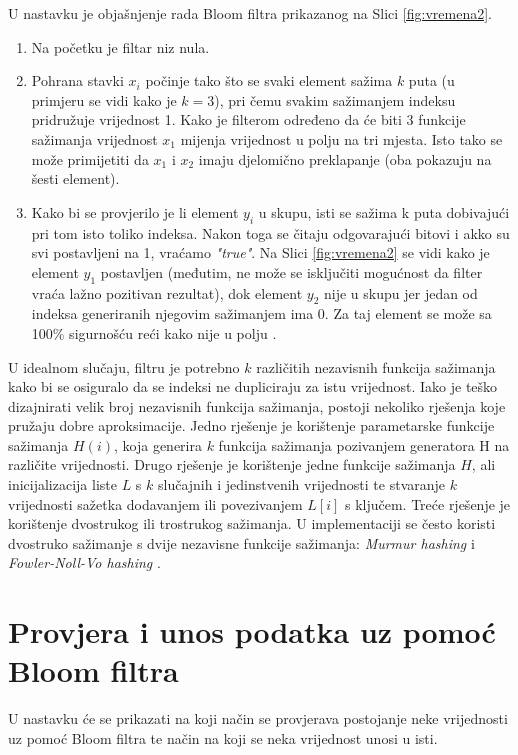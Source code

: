 \documentclass{foi}
\begin{document}
U nastavku je objašnjenje rada Bloom filtra prikazanog na Slici \ref{fig:vremena2}.
\begin{enumerate}[label=\Alph*)]
\item Na početku je filtar niz nula.
\item Pohrana stavki $x_i$ počinje tako što se svaki element sažima $k$ puta (u primjeru se vidi kako je $k=3$), pri čemu svakim sažimanjem indeksu pridružuje vrijednost 1. Kako je filterom određeno da će biti 3 funkcije sažimanja vrijednost $x_1$ mijenja vrijednost u polju na tri mjesta. Isto tako se može primijetiti da $x_1$ i $x_2$ imaju djelomično preklapanje (oba pokazuju na šesti element).
\item Kako bi se provjerilo je li element $y_i$ u skupu, isti se sažima k puta dobivajući pri tom isto toliko indeksa. Nakon toga se čitaju odgovarajući bitovi i akko su svi postavljeni na 1, vraćamo \textit{"true"}. Na Slici \ref{fig:vremena2} se vidi kako je element $y_1$ postavljen (međutim, ne može se isključiti mogućnost da filter vraća lažno pozitivan rezultat), dok element $y_2$ nije u skupu jer jedan od indeksa generiranih njegovim sažimanjem ima 0. Za taj element se može sa 100\% sigurnošću reći kako nije u polju \cite{la2021advanced}.
\end{enumerate}

U idealnom slučaju, filtru je potrebno $k$ različitih nezavisnih funkcija sažimanja kako bi se osiguralo da se indeksi ne dupliciraju za istu vrijednost. Iako je teško dizajnirati velik broj nezavisnih funkcija sažimanja, postoji nekoliko rješenja koje pružaju dobre aproksimacije. Jedno rješenje je korištenje parametarske funkcije sažimanja $H(i)$, koja generira $k$ funkcija sažimanja pozivanjem generatora H na različite vrijednosti. Drugo rješenje je korištenje jedne funkcije sažimanja $H$, ali inicijalizacija liste $L$ s $k$ slučajnih i jedinstvenih vrijednosti te stvaranje $k$ vrijednosti sažetka dodavanjem ili povezivanjem $L[i]$ s ključem. Treće rješenje je korištenje dvostrukog ili trostrukog sažimanja. U implementaciji se često koristi dvostruko sažimanje s dvije nezavisne funkcije sažimanja: \textit{Murmur hashing} i \textit{Fowler-Noll-Vo hashing} \cite{la2021advanced}.

\section{Provjera i unos podatka uz pomoć Bloom filtra}
U nastavku će se prikazati na koji način se provjerava postojanje neke vrijednosti uz pomoć Bloom filtra te način na koji se neka vrijednost unosi u isti.
\end{document}
